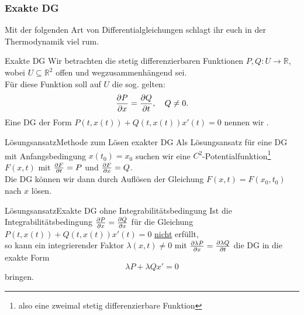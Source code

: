 \subsubsection{Exakte DG}
Mit der folgenden Art von Differentialgleichungen schlagt ihr euch in der Thermodynamik viel rum.
\begin{Def}
{Exakte DG}
Wir betrachten die stetig differenzierbaren Funktionen $P,Q:U\to\mathbb{R}$, wobei $U\subseteq\mathbb{R}^2$ offen und wegzusammenhängend sei.\\
Für diese Funktion soll auf $U$ die sog.  gelten: 
\begin{equation*}
    \frac{\partial P}{\partial x}=\frac{\partial Q}{\partial t},\quad Q\neq0.
\end{equation*}
Eine DG der Form $P(t,x(t))+Q(t,x(t))x'(t)=0$ nennen wir . 
\end{Def}
\begin{Satz}
{Lösungsansatz}{Methode zum Lösen exakter DG}
Als Lösungsansatz für eine DG mit Anfangsbedingung $x(t_0)=x_0$ suchen wir eine $C^2$-Potentialfunktion\footnote{also eine zweimal stetig differenzierbare Funktion} $F(x,t)$ mit $\frac{\partial F}{\partial t}=P$ und $\frac{\partial F}{\partial x}=Q$.\\
Die DG können wir dann durch Auflösen der Gleichung $F(x,t)=F(x_0,t_0)$ nach $x$ lösen.
\end{Satz}
\begin{Satz}
{Lösungsansatz}{Exakte DG ohne Integrabilitätsbedingung}
Ist die Integrabilitätsbedingung $\frac{\partial P}{\partial x}=\frac{\partial Q}{\partial x}$ für die Gleichung $P(t,x(t))+Q(t,x(t))x'(t)=0$ \underline{nicht} erfüllt,\\
so kann ein integrierender Faktor $\lambda(x,t)\neq0$ mit $\frac{\partial\lambda P}{\partial x}=\frac{\partial\lambda Q}{\partial t}$ die DG in die exakte Form
\begin{equation*}
    \lambda P+ \lambda Q x'=0
\end{equation*}
bringen.
\end{Satz}

